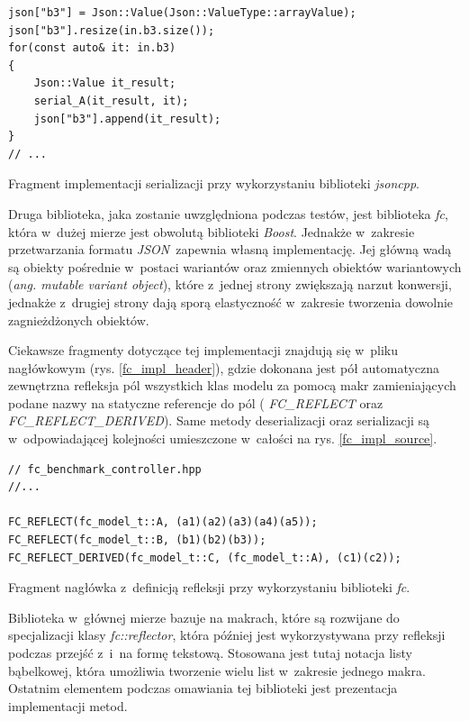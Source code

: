 \documentclass[12pt]{article}
\newcommand{\n}{\newline}
\newcommand{\nonpl}[1]{{\it #1}}
\newcommand{\code}[1]{{\it #1}}
\newcommand{\ang}[1]{\nonpl{ang. #1}}
\newcommand{\JSON}{\nonpl{JSON}}
\begin{document}
{{{\begin{captioned}[H]
\begin{lstlisting}[frame=single]
json["b3"] = Json::Value(Json::ValueType::arrayValue);
json["b3"].resize(in.b3.size());
for(const auto& it: in.b3)
{
	Json::Value it_result;
	serial_A(it_result, it);
	json["b3"].append(it_result);
}
// ...
					\end{lstlisting}
					\caption{ Fragment implementacji serializacji przy wykorzystaniu biblioteki \nonpl{jsoncpp}.}
					\label{jsoncpp_impl}
				\end{captioned}

				Druga biblioteka, jaka zostanie uwzględniona podczas testów, jest biblioteka \nonpl{fc}\cite{fc_repo}, która w~dużej mierze jest obwolutą biblioteki
				\nonpl{Boost}\cite{boost}. Jednakże w~zakresie przetwarzania formatu \JSON~zapewnia własną implementację. Jej główną wadą są obiekty pośrednie
				w~postaci wariantów oraz zmiennych obiektów wariantowych (\ang{mutable variant object}), które z~jednej strony zwiększają narzut konwersji,
				jednakże z~drugiej strony dają sporą elastyczność w~zakresie tworzenia dowolnie zagnieżdżonych obiektów.\n

				Ciekawsze fragmenty dotyczące tej implementacji znajdują się w~pliku nagłówkowym (rys. \ref{fc_impl_header}), gdzie dokonana jest
				pół automatyczna zewnętrzna refleksja pól wszystkich klas modelu za pomocą makr zamieniających podane nazwy na statyczne referencje do pól (
				\code{FC\_REFLECT} oraz \code{FC\_REFLECT\_DERIVED}). Same metody deserializacji oraz serializacji są w~odpowiadającej kolejności umieszczone
				w~całości na rys. \ref{fc_impl_source}.\n

				\begin{captioned}[H]
					\begin{lstlisting}[frame=single]
// fc_benchmark_controller.hpp
//...

FC_REFLECT(fc_model_t::A, (a1)(a2)(a3)(a4)(a5));
FC_REFLECT(fc_model_t::B, (b1)(b2)(b3));
FC_REFLECT_DERIVED(fc_model_t::C, (fc_model_t::A), (c1)(c2));
					\end{lstlisting}
					\caption{ Fragment nagłówka z~definicją refleksji przy wykorzystaniu biblioteki \nonpl{fc}.}
					\label{fc_impl_header}
				\end{captioned}

				Biblioteka w~głównej mierze bazuje na makrach, które są rozwijane do specjalizacji klasy \code{fc::reflector}, która później jest
				wykorzystywana przy refleksji podczas przejść z~i~na formę tekstową. Stosowana jest tutaj notacja listy bąbelkowej, która umożliwia
				tworzenie wielu list w~zakresie jednego makra. Ostatnim elementem podczas omawiania tej biblioteki jest prezentacja implementacji metod.\n

}}}
\end{document}
